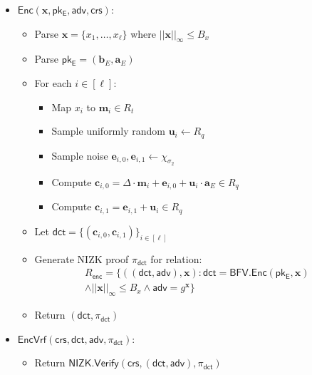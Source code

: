 \begin{itemize}
\item $\mathsf{Enc}(\mathbf{x}, \mathsf{pk_E}, \mathsf{adv}, \mathsf{crs})$:
   \begin{itemize}
       \item Parse $\mathbf{x}=\{x_1,\ldots,x_\ell\}$ where $||\mathbf{x}||_\infty \leq B_x$
       \item Parse $\mathsf{pk_E} = (\mathbf{b}_E, \mathbf{a}_E)$
       \item For each $i \in [\ell]$:
           \begin{itemize}
               \item Map $x_i$ to $\mathbf{m}_i \in R_t$
               \item Sample uniformly random $\mathbf{u}_i \leftarrow R_q$
               \item Sample noise $\mathbf{e}_{i,0}, \mathbf{e}_{i,1} \leftarrow \chi_{\sigma_2}$
               \item Compute $\mathbf{c}_{i,0} = \Delta \cdot \mathbf{m}_i + \mathbf{e}_{i,0} + \mathbf{u}_i \cdot \mathbf{a}_E \in R_q$
               \item Compute $\mathbf{c}_{i,1} = \mathbf{e}_{i,1} + \mathbf{u}_i \in R_q$
           \end{itemize}
       \item Let $\mathsf{dct}=\{(\mathbf{c}_{i,0}, \mathbf{c}_{i,1})\}_{i \in [\ell]}$
       \item Generate NIZK proof $\pi_{\mathsf{dct}}$ for relation:
           \begin{align*}
           R_{\mathsf{enc}} = \{((\mathsf{dct},\mathsf{adv}), \mathbf{x}) : \mathsf{dct} = \mathsf{BFV.Enc(pk_E,\mathbf{x})} \\\land ||\mathbf{x}||_\infty \leq B_x \land \mathsf{adv}=g^\mathbf{x}\}
           \end{align*}
       \item Return $(\mathsf{dct},\pi_{\mathsf{dct}})$
   \end{itemize}
   
\item $\mathsf{EncVrf}(\mathsf{crs}, \mathsf{dct}, \mathsf{adv}, \pi_{\mathsf{dct}})$:
   \begin{itemize}
       \item Return $\mathsf{NIZK.Verify}(\mathsf{crs}, (\mathsf{dct},\mathsf{adv}), \pi_{\mathsf{dct}})$
   \end{itemize}


\end{itemize}
